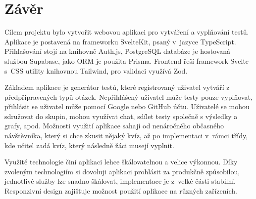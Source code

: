 \documentclass[12pt, a4paper,
openright
]{report}
\let\oldchapter\chapter
\renewcommand{\chapter}{
	\clearpage
	\pagestyle{fancy}
	\oldchapter
}
\begin{document}


\chapter{Závěr}
	
Cílem projektu bylo vytvořit webovou aplikaci pro vytváření a vyplňování testů. Aplikace je postavená na frameworku SvelteKit, psaný v~jazyce TypeScript. Přihlašování stojí na knihovně Auth.js, PostgreSQL databáze je hostovaná službou Supabase, jako ORM je použita Prisma. Frontend řeší framework Svelte s~CSS utility knihovnou Tailwind, pro validaci využívá Zod.

Základem aplikace je generátor testů, které registrovaný uživatel vytváří z předpřipravených typů otázek. Nepřihlášený uživatel může testy pouze vyplňovat, přihlásit se uživatel může pomocí Google nebo GitHub účtu. Uživatelé se mohou sdružovat do skupin, mohou využívat chat, sdílet testy společně s výsledky a grafy, apod. Možnosti využití aplikace sahají od nenáročného občasného návštěvníka, který si chce zkusit nějaký kvíz, až po implementaci v~rámci třídy, kde učitel zadá kvíz, který následně žáci musejí vyplnit.

Využité technologie činí aplikaci lehce škálovatelnou a velice výkonnou. Díky zvoleným technologiím si dovoluji aplikaci prohlásit za produkčně způsobilou, jednotlivé služby lze snadno škálovat, implementace je z~velké části stabilní. Responzivní design zajišťuje možnost použití aplikace na různých zařízeních.
\end{document}
